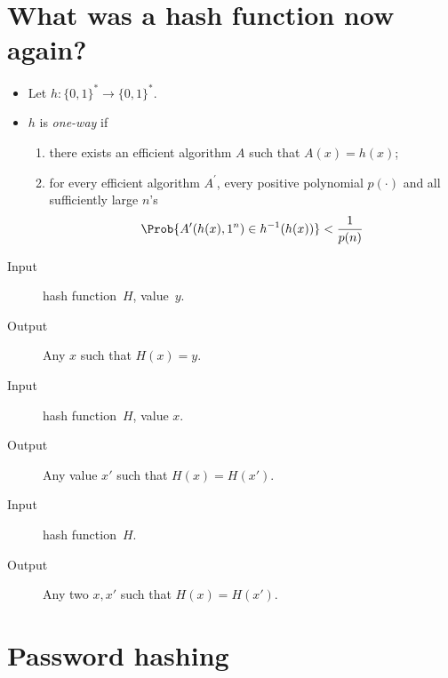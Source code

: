 \mode*

\section[Hash functions]{What was a hash function now again?}

\begin{frame}
  \begin{definition}
    \begin{itemize}
      \item Let \(h\colon \{0,1\}^*\to \{0,1\}^*\).
      \item \(h\) is \emph{one-way} if
        \begin{enumerate}
          \item there exists an efficient algorithm \(A\) such that \(A(x) 
              = h(x)\);
          \item for every efficient algorithm \(A^\prime\), every positive 
            polynomial \(p(\cdot)\) and all sufficiently large \(n\)'s
            \[\Prob{A^\prime(h(x), 1^n) \in h^{-1}(h(x))} < \frac{1}{p(n)}\]
        \end{enumerate}
    \end{itemize}
  \end{definition}
\end{frame}

\begin{frame}
  \begin{definition}
    \begin{description}
      \item[Input] hash function~\(H\), value~\(y\).
      \item[Output] Any \(x\) such that \(H(x) = y\).
    \end{description}
  \end{definition}

  \begin{definition}
    \begin{description}
      \item[Input] hash function~\(H\), value \(x\).
      \item[Output] Any value \(x'\) such that \(H(x) = H(x')\).
    \end{description}
  \end{definition}

  \begin{definition}
    \begin{description}
      \item[Input] hash function~\(H\).
      \item[Output] Any two \(x, x'\) such that \(H(x) = H(x')\).
    \end{description}
  \end{definition}
\end{frame}


\section{Password hashing}

